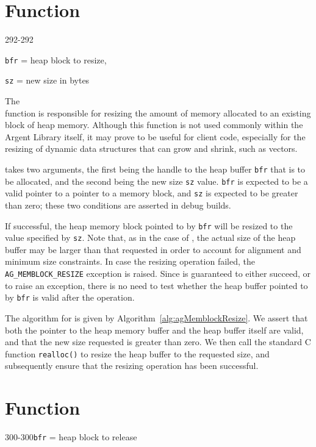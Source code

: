 %
%
\section{Function \agMemblockResize}
\label{sec:agMemblockResize}

  {292-292}{\texttt{bfr} = heap block to resize,\par\texttt{sz} = new size in
  bytes}

The \agMemblockResize{} \\ function is responsible for resizing the amount of 
memory allocated to an existing block of heap memory. Although this function is 
not used commonly within the Argent Library itself, it may prove to be useful 
for client code, especially for the resizing of dynamic data structures that can
grow and shrink, such as vectors.

\agMemblockResize{} takes two arguments, the first being the handle to the heap
buffer \texttt{bfr} that is to be allocated, and the second being the new size 
\texttt{sz} value. \texttt{bfr} is expected to be a valid pointer to a pointer 
to a memory block, and \texttt{sz} is expected to be greater than zero; these 
two conditions are asserted in debug builds.


If successful, the heap memory block pointed to by \texttt{bfr} will be resized 
to the value specified by \texttt{sz}. Note that, as in the case of 
\agMemblockNew, the actual size of the heap buffer may be larger than that
requested in order to account for alignment and minimum size constraints. In
case the resizing operation failed, the \texttt{AG\_MEMBLOCK\_RESIZE} exception 
is raised. Since \agMemblockResize{} is guaranteed to either succeed, or to raise
an exception, there is no need to test whether the heap buffer pointed to by 
\texttt{bfr} is valid after the operation.

The algorithm for \agMemblockResize{} is given by Algorithm\ 
\ref{alg:agMemblockResize}. We assert that both the pointer to the heap memory 
buffer and the heap buffer itself are valid, and that the new size requested is 
greater than zero. We then call the standard C function \texttt{realloc()} to 
resize the heap buffer to the requested size, and subsequently ensure that the 
resizing operation has been successful.

%
%
\section{Function \agMemblockFree}
  {300-300}{\texttt{bfr} = heap block to release}
\kant[1]
